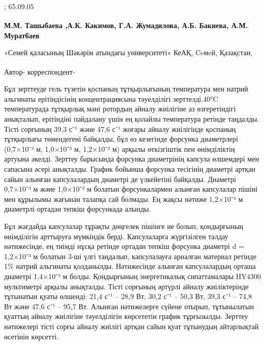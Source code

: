 ; 65.09.05

\begin{articleheader}

{\bfseries
М.М. Ташыбаева\textsuperscript{\envelope }
,А.К. Какимов,
Г.А. Жумадилова,
А.Б. Бакиева,
А.М. Муратбаев
}
\end{articleheader}

\begin{affiliation}
«Семей қаласының Шәкәрім атындағы университеті» КеАҚ, Ceмeй, Қазақстан,

\raggedright \textsuperscript{\envelope } Автор- корреспондент-
\href{mailto:marzhan06081990@gmail.com}{}
\end{affiliation}

Бұл зерттеуде гель түзетін қоспаның тұтқырлығының температура мен натрий
альгинаты ерітіндісінің концентрациясына тәуелділігі зерттелді.40°C
температурада тұтқырлық мәні ротордың айналу жиілігіне аз өзгеретіндігі
анықталып, ерітіндіні пайдалану үшін ең қолайлы температура ретінде
таңдалды. Тісті сорғының 39,3 с⁻¹ және 47,6 с⁻¹ жоғары айналу жиілігінде
қоспаның тұтқырлығы төмендегені байқалды, бұл өз кезегінде форсунка
диаметрлері (0,7×10⁻³ м, 1,0×10⁻³ м, 1,2×10⁻³ м) арқылы өткізгіштік пен
өнімділіктің артуына әкелді. Зерттеу барысында форсунка диаметрінің
капсула өлшемдері мен сапасына әсері анықталды. График бойынша форсунка
тесігінің диаметрі артқан сайын алынған капсулалардың диаметрі де
үлкейетіні байқалды. Диаметрі 0,7×10⁻³ м және 1,0×10⁻³ м болатын
форсункалармен алынған капсулалар пішіні мен құрылымы жағынан талапқа
сай болмады. Ең жақсы нәтиже 1,2×10⁻³ м диаметрлі ортадан тепкіш
форсункада алынды.

Бұл жағдайда капсулалар тұрақты дөңгелек пішінге ие болып, қондырғының
өнімділігін арттыруға мүмкіндік берді. Капсулаларға жүргізілген талдау
нәтижесінде, ең тиімді нұсқа ретінде ортадан тепкіш форсунка диаметрі d
= 1,2×10⁻³ м болатын 3-ші үлгі таңдалып, капсулалауға арналған материал
ретінде 1\% натрий альгинаты қолданылды. Нәтижесінде алынған
капсулалардың орташа диаметрі 1,4×10⁻³ м болды. Қондырғының
энергетикалық сипаттамалары HY4300 мультиметрі арқылы анықталды. Тісті
сорғының әртүрлі айналу жиіліктерінде тұтынатын қуаты өлшенді: 21,4 с⁻¹
-- 28,9 Вт, 30,2 с⁻¹ -- 50,3 Вт, 39,3 с⁻¹ -- 74,8 Вт және 47,6 с⁻¹ --
95,7 Вт. Алынған нәтижелерге сүйене отырып, тұтынылатын қуаттың айналу
жиілігіне тәуелділігін көрсететін график тұрғызылды. Зерттеу нәтижелері
тісті сорғы айналу жиілігі артқан сайын қуат тұтынудың айтарлықтай
өсетінін көрсетті.

